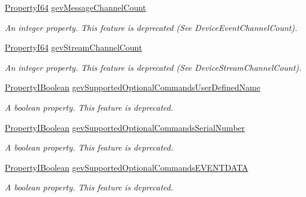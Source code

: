 \begin{DoxyCompactItemize}
\hyperlink{group___common_interface_ga81749b2696755513663492664a18a893}{Property\+I64} \hyperlink{classmv_i_m_p_a_c_t_1_1acquire_1_1_gen_i_cam_1_1_transport_layer_control_af689a7e45d74fa1d376432ab51f8784a}{gev\+Message\+Channel\+Count}
\begin{DoxyCompactList}\small\item\em An integer property. This feature is deprecated (See Device\+Event\+Channel\+Count). \end{DoxyCompactList}\item 
\hyperlink{group___common_interface_ga81749b2696755513663492664a18a893}{Property\+I64} \hyperlink{classmv_i_m_p_a_c_t_1_1acquire_1_1_gen_i_cam_1_1_transport_layer_control_aa79a69d74d942c7937ec0b45a8ac95ce}{gev\+Stream\+Channel\+Count}
\begin{DoxyCompactList}\small\item\em An integer property. This feature is deprecated (See Device\+Stream\+Channel\+Count). \end{DoxyCompactList}\item 
\hyperlink{group___common_interface_ga44f9437e24b21b6c93da9039ec6786aa}{Property\+I\+Boolean} \hyperlink{classmv_i_m_p_a_c_t_1_1acquire_1_1_gen_i_cam_1_1_transport_layer_control_a670ace5fb50f46c1b4072779e375e041}{gev\+Supported\+Optional\+Commands\+User\+Defined\+Name}
\begin{DoxyCompactList}\small\item\em A boolean property. This feature is deprecated. \end{DoxyCompactList}\item 
\hyperlink{group___common_interface_ga44f9437e24b21b6c93da9039ec6786aa}{Property\+I\+Boolean} \hyperlink{classmv_i_m_p_a_c_t_1_1acquire_1_1_gen_i_cam_1_1_transport_layer_control_afb42bd4fd6a0693ebd11db22fa072028}{gev\+Supported\+Optional\+Commands\+Serial\+Number}
\begin{DoxyCompactList}\small\item\em A boolean property. This feature is deprecated. \end{DoxyCompactList}\item 
\hyperlink{group___common_interface_ga44f9437e24b21b6c93da9039ec6786aa}{Property\+I\+Boolean} \hyperlink{classmv_i_m_p_a_c_t_1_1acquire_1_1_gen_i_cam_1_1_transport_layer_control_ae4f0b33c477d2fcb26fc0aebc24a0b40}{gev\+Supported\+Optional\+Commands\+E\+V\+E\+N\+T\+D\+A\+T\+A}
\begin{DoxyCompactList}\small\item\em A boolean property. This feature is deprecated. \end{DoxyCompactList}\item 

\end{DoxyCompactItemize}
